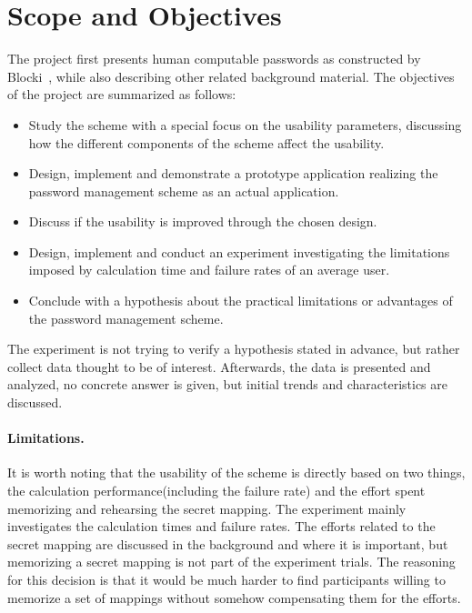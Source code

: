 
\section{Scope and Objectives}
The project first presents human computable passwords as constructed by Blocki~\cite{hcp-blocki}, while also describing other related background material. The objectives of the project are summarized as follows:
\begin{itemize}
    \item Study the scheme with a special focus on the usability parameters, discussing how the different components of the scheme affect the usability.
    \item Design, implement and demonstrate a prototype application realizing the password management scheme as an actual application.
    \item Discuss if the usability is improved through the chosen design. 
    \item Design, implement and conduct an experiment investigating the limitations imposed by calculation time and failure rates of an average user.
    \item Conclude with a hypothesis about the practical limitations or advantages of the password management scheme.
\end{itemize}
\par The experiment is not trying to verify a hypothesis stated in advance, but rather collect data thought to be of interest. Afterwards, the data is presented and analyzed, no concrete answer is given, but initial trends and characteristics are discussed.
\paragraph{Limitations.}
It is worth noting that the usability of the scheme is directly based on two things, the calculation performance(including the failure rate) and the effort spent memorizing and rehearsing the secret mapping. The experiment mainly investigates the calculation times and failure rates. The efforts related to the secret mapping are discussed in the background and where it is important, but memorizing a secret mapping is not part of the experiment trials. The reasoning for this decision is that it would be much harder to find participants willing to memorize a set of mappings without somehow compensating them for the efforts.



